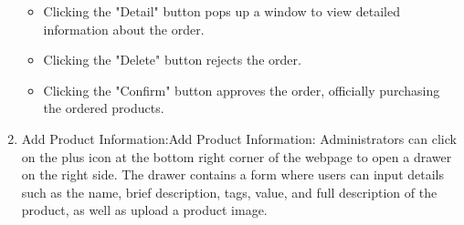 \documentclass{article}
\begin{document}
\begin{enumerate}
    \begin{itemize}
        \item Clicking the "Detail" button pops up a window to view detailed information about the order.
        \item Clicking the "Delete" button rejects the order.
        \item Clicking the "Confirm" button approves the order, officially purchasing the ordered products.
    \end{itemize}
    \item Add Product Information:Add Product Information: Administrators can click on the plus icon at the bottom right corner of the webpage to open a drawer on the right side. The drawer contains a form where users can input details such as the name, brief description, tags, value, and full description of the product, as well as upload a product image.

\end{enumerate}
\end{document}
